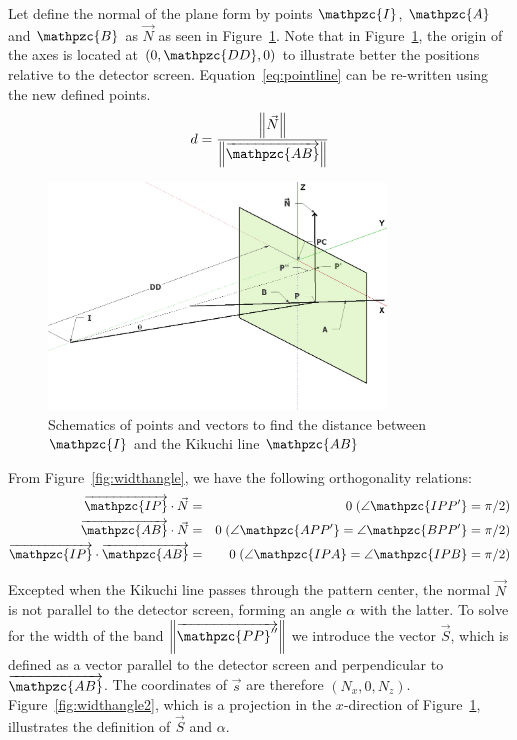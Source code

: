 \documentclass[letterpaper]{article}
\newcommand{\norm}[1]{\left\|#1\right\|}
\newcommand{\var}[1]{\mathpzc{#1}}
\begin{document}
	
	Let define the normal of the plane form by points $\var{I}$, $\var{A}$ and $\var{B}$ as $\vec{N}$ as seen in Figure~\ref{fig:widthangle1}. Note that in Figure~\ref{fig:widthangle1}, the origin of the axes is located at $(0,\var{DD},0)$ to illustrate better the positions relative to the detector screen. Equation~\ref{eq:pointline} can be re-written using the new defined points.
	\begin{eqnarray}
		d = \frac{\norm{\vec{N}}}{\norm{\overrightarrow{\var{AB}}}}
		\label{eq:pointline2}
	\end{eqnarray}
	
	\begin{figure}
		\centering
		\includegraphics[width=0.8\textwidth]{figures/widthangle1}
		\caption{Schematics of points and vectors to find the distance between $\var{I}$ and the Kikuchi line $\var{AB}$}
		\label{fig:widthangle1}
	\end{figure}
	
	From Figure~\ref{fig:widthangle}, we have the following orthogonality relations:
	\begin{eqnarray}
		\overrightarrow{\var{IP}} \cdot \vec{N} & = & 0 \; (\angle\var{IPP^\prime} = \pi/2)\\
		\overrightarrow{\var{AB}} \cdot \vec{N} & = & 0 \; (\angle\var{APP^\prime} = \angle\var{BPP^\prime} = \pi/2)\\
		\overrightarrow{\var{IP}} \cdot \overrightarrow{\var{AB}} & = & 0 \; (\angle\var{IPA} = \angle\var{IPB} = \pi/2)
		\label{eq:orthogonality}
	\end{eqnarray}
	
	Excepted when the Kikuchi line passes through the pattern center, the normal $\vec{N}$ is not parallel to the detector screen, forming an angle $\alpha$ with the latter. To solve for the width of the band $\norm{\overrightarrow{\var{PP}^{\prime\prime}}}$ we introduce the vector $\vec{S}$, which is defined as a vector parallel to the detector screen and perpendicular to $\overrightarrow{\var{AB}}$. The coordinates of $\vec{s}$ are therefore $(N_x, 0, N_z)$. Figure~\ref{fig:widthangle2}, which is a projection in the $x$-direction of Figure~\ref{fig:widthangle1}, illustrates the definition of $\vec{S}$ and $\alpha$.
	
\end{document}
